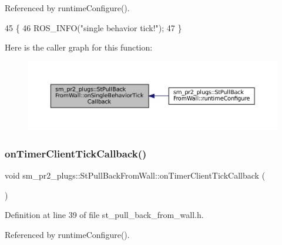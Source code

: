 Referenced by runtime\+Configure().


\begin{DoxyCode}
45     \{
46         ROS\_INFO(\textcolor{stringliteral}{"single behavior tick!"});
47     \}
\end{DoxyCode}
Here is the caller graph for this function\+:
\nopagebreak
\begin{figure}[H]
\begin{center}
\leavevmode
\includegraphics[width=350pt]{structsm__pr2__plugs_1_1StPullBackFromWall_a42e04e36271bd14285b42df5c1988209_icgraph}
\end{center}
\end{figure}
\mbox{\label{structsm__pr2__plugs_1_1StPullBackFromWall_a7872156a77c675539830c016e703c499}} 
\subsubsection{\texorpdfstring{on\+Timer\+Client\+Tick\+Callback()}{onTimerClientTickCallback()}}
{\footnotesize\ttfamily void sm\+\_\+pr2\+\_\+plugs\+::\+St\+Pull\+Back\+From\+Wall\+::on\+Timer\+Client\+Tick\+Callback (\begin{DoxyParamCaption}{ }\end{DoxyParamCaption})\hspace{0.3cm}{\ttfamily [inline]}}



Definition at line 39 of file st\+\_\+pull\+\_\+back\+\_\+from\+\_\+wall.\+h.



Referenced by runtime\+Configure().


